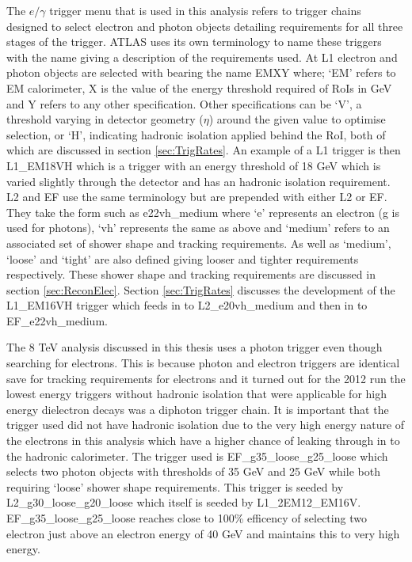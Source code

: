 		The $e/\gamma$ trigger menu that is used in this analysis refers to trigger chains designed to select electron and photon objects detailing requirements for all three stages of the trigger. ATLAS uses its own terminology to name these triggers with the name giving a description of the requirements used. At L1 electron and photon objects are selected with bearing the name EMXY where; `EM' refers to EM calorimeter, X is the value of the energy threshold required of RoIs in GeV and Y refers to any other specification. Other specifications can be `V', a threshold varying in detector geometry ($\eta$) around the given value to optimise selection, or `H', indicating hadronic isolation applied behind the RoI, both of which are discussed in section \ref{sec:TrigRates}. An example of a L1 trigger is then L1\_EM18VH which is a trigger with an energy threshold of 18 GeV which is varied slightly through the detector and has an hadronic isolation requirement. L2 and EF use the same terminology but are prepended with either L2 or EF. They take the form such as e22vh\_medium where `e' represents an electron (g is used for photons), `vh' represents the same as above and `medium' refers to an associated set of shower shape and tracking requirements. As well as `medium', `loose' and `tight' are also defined giving looser and tighter requirements respectively. These shower shape and tracking requirements are discussed in section \ref{sec:ReconElec}. Section \ref{sec:TrigRates} discusses the development of the L1\_EM16VH trigger which feeds in to L2\_e20vh\_medium and then in to EF\_e22vh\_medium. 

		The 8 TeV analysis discussed in this thesis uses a photon trigger even though searching for electrons. This is because photon and electron triggers are identical save for tracking requirements for electrons and it turned out for the 2012 run the lowest energy triggers without hadronic isolation that were applicable for high energy dielectron decays was a diphoton trigger chain. It is important that the trigger used did not have hadronic isolation due to the very high energy nature of the electrons in this analysis which have a higher chance of leaking through in to the hadronic calorimeter. The trigger used is EF\_g35\_loose\_g25\_loose which selects two photon objects with thresholds of 35 GeV and 25 GeV while both requiring `loose' shower shape requirements. This trigger is seeded by L2\_g30\_loose\_g20\_loose which itself is seeded by L1\_2EM12\_EM16V. EF\_g35\_loose\_g25\_loose reaches close to 100\% efficency of selecting two electron just above an electron energy of 40 GeV and maintains this to very high energy.

